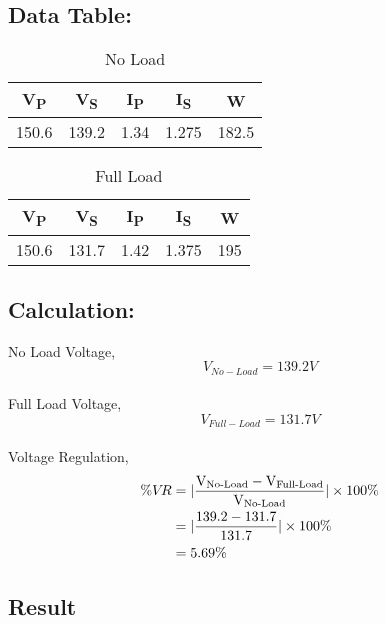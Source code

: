 \documentclass[12pt]{article}
\begin{document}
\subsection{Data Table:}
\begin{table}[H]
    \centering
    \caption{No Load}
    \begin{tabular}{|c|c|c|c|c|}
        \hline
        \bf{V\textsubscript{P}} & \bf{V\textsubscript{S}} & \bf{I\textsubscript{P}} & \bf{I\textsubscript{S}} & \bf{W} \\
        \hline
        150.6                   & 139.2                   & 1.34                    & 1.275                   & 182.5  \\
        \hline
    \end{tabular}
\end{table}
\begin{table}[H]
    \centering
    \caption{Full Load}
    \begin{tabular}{|c|c|c|c|c|}
        \hline
        \bf{V\textsubscript{P}} & \bf{V\textsubscript{S}} & \bf{I\textsubscript{P}} & \bf{I\textsubscript{S}} & \bf{W} \\
        \hline
        150.6                   & 131.7                   & 1.42                    & 1.375                   & 195    \\
        \hline
    \end{tabular}
\end{table}

\subsection{Calculation:}
No Load Voltage,\[V_{No-Load} = 139.2V\]\\
Full Load Voltage,\[V_{Full-Load} = 131.7V\]\\
Voltage Regulation,
\begin{align*}
    \%V\!R & = |\frac{\text{V\textsubscript{No-Load}}-\text{V\textsubscript{Full-Load}}}{\text{V\textsubscript{No-Load}}}|\times 100\% \\
           & = |\frac{139.2-131.7}{131.7}|\times 100\%                                                                                 \\
           & = 5.69\%
\end{align*}
\subsection{Result}
\end{document}
